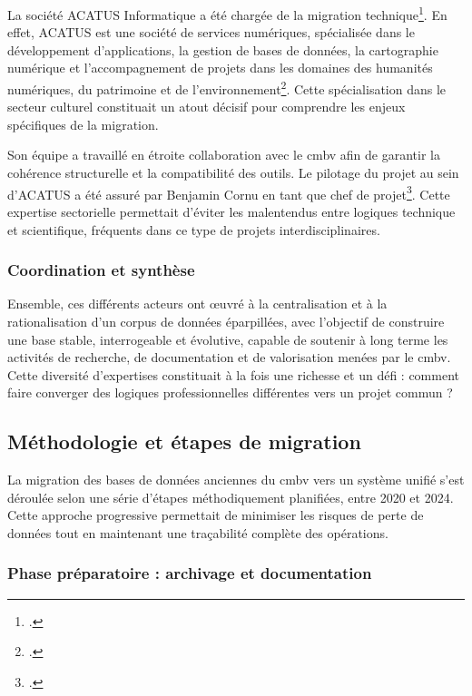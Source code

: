 La société ACATUS Informatique a été chargée de la migration technique\footcite{BaseDonneesPHILIDOR42024}. En effet, ACATUS est une société de services numériques, spécialisée dans le développement d'applications, la gestion de bases de données, la cartographie numérique et l'accompagnement de projets dans les domaines des humanités numériques, du patrimoine et de l'environnement\footcite{ACATUSInformatiqueActeur}. Cette spécialisation dans le secteur culturel constituait un atout décisif pour comprendre les enjeux spécifiques de la migration.

Son équipe a travaillé en étroite collaboration avec le \gls{cmbv} afin de garantir la cohérence structurelle et la compatibilité des outils. Le pilotage du projet au sein d'ACATUS a été assuré par Benjamin Cornu en tant que chef de projet\footcite{BaseDonneesPHILIDOR42024}. Cette expertise sectorielle permettait d'éviter les malentendus entre logiques technique et scientifique, fréquents dans ce type de projets interdisciplinaires.

\subsubsection{Coordination et synthèse}

Ensemble, ces différents acteurs ont œuvré à la centralisation et à la rationalisation d'un corpus de données éparpillées, avec l'objectif de construire une base stable, interrogeable et évolutive, capable de soutenir à long terme les activités de recherche, de documentation et de valorisation menées par le \gls{cmbv}. Cette diversité d'expertises constituait à la fois une richesse et un défi : comment faire converger des logiques professionnelles différentes vers un projet commun ?

\subsection{Méthodologie et étapes de migration}

La migration des bases de données anciennes du \gls{cmbv} vers un système unifié s'est déroulée selon une série d'étapes méthodiquement planifiées, entre 2020 et 2024. Cette approche progressive permettait de minimiser les risques de perte de données tout en maintenant une traçabilité complète des opérations.

\subsubsection{Phase préparatoire : archivage et documentation}


